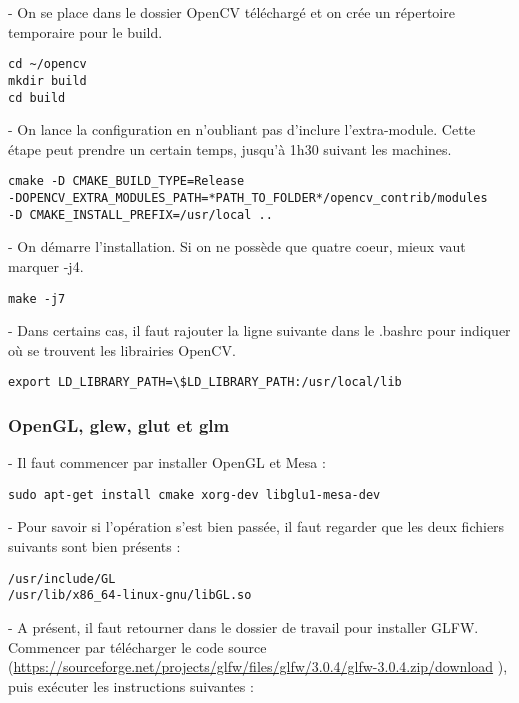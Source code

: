 - On se place dans le dossier OpenCV téléchargé et on crée un répertoire temporaire pour le build.

\begin{verbatim}
cd ~/opencv
mkdir build
cd build
\end{verbatim}

- On lance la configuration en n'oubliant pas d'inclure l'extra-module. Cette étape peut prendre un certain temps, jusqu'à 1h30 suivant les machines.

\begin{verbatim}
cmake -D CMAKE_BUILD_TYPE=Release
-DOPENCV_EXTRA_MODULES_PATH=*PATH_TO_FOLDER*/opencv_contrib/modules
-D CMAKE_INSTALL_PREFIX=/usr/local ..
\end{verbatim}

- On démarre l'installation. Si on ne possède que quatre coeur, mieux vaut marquer -j4.

\begin{verbatim}
make -j7
\end{verbatim}

- Dans certains cas, il faut rajouter la ligne suivante dans le .bashrc pour indiquer où se trouvent les librairies OpenCV.

\begin{verbatim}
export LD_LIBRARY_PATH=\$LD_LIBRARY_PATH:/usr/local/lib
\end{verbatim}


\subsubsection{OpenGL, glew, glut et glm}

- Il faut commencer par installer OpenGL et Mesa :

\begin{verbatim}
sudo apt-get install cmake xorg-dev libglu1-mesa-dev
\end{verbatim}

- Pour savoir si l'opération s'est bien passée, il faut regarder que les deux fichiers suivants sont bien présents :

\begin{verbatim}
/usr/include/GL
/usr/lib/x86_64-linux-gnu/libGL.so
\end{verbatim}

- A présent, il faut retourner dans le dossier de travail pour installer GLFW. Commencer par télécharger le code source (\url{https://sourceforge.net/projects/glfw/files/glfw/3.0.4/glfw-3.0.4.zip/download} ), puis exécuter les instructions suivantes :

